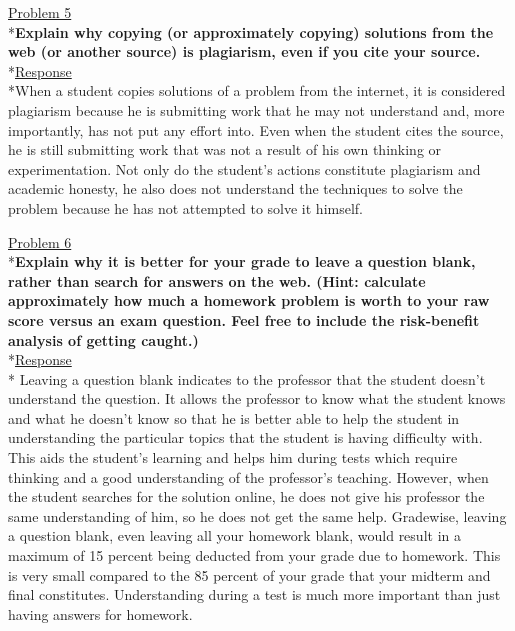 \documentclass[11pt]{article}
\begin{document}
\noindent
\uline{Problem 5}
\\*\textbf{Explain why copying (or approximately copying) solutions from the web (or another source) is
plagiarism, even if you cite your source.}
\medskip
\\*\uline{Response}
\\*When a student copies solutions of a problem from the internet, it is considered plagiarism because he is submitting work that he may not understand and, more importantly, has not put any effort into. Even when the student cites the source, he is still submitting work that was not a result of his own thinking or experimentation. Not only do the student's actions constitute plagiarism and academic honesty, he also does not understand the techniques to solve the problem because he has not attempted to solve it himself. 
\bigskip\bigskip

\noindent
\uline{Problem 6}
\\*\textbf{Explain why it is better for your grade to leave a question blank, rather than search for answers on the web.  (Hint: calculate approximately how much a homework problem is worth to your raw score versus an exam question. Feel free to include the risk-benefit analysis of getting caught.)}
\medskip
\\*\uline{Response}
\\* Leaving a question blank indicates to the professor that the student doesn't understand the question. It allows the professor to know what the student knows and what he doesn't know so that he is better able to help the student in understanding the particular topics that the student is having difficulty with. This aids the student's learning and helps him during tests which require thinking and a good understanding of the professor's teaching. However, when the student searches for the solution online, he does not give his professor the same understanding of him, so he does not get the same help. Gradewise, leaving a question blank, even leaving all your homework blank, would result in a maximum of 15 percent being deducted from your grade due to homework. This is very small compared to the 85 percent of your grade that your midterm and final constitutes. Understanding during a test is much more important than just having answers for homework. 
\bigskip\bigskip
\end{document}
